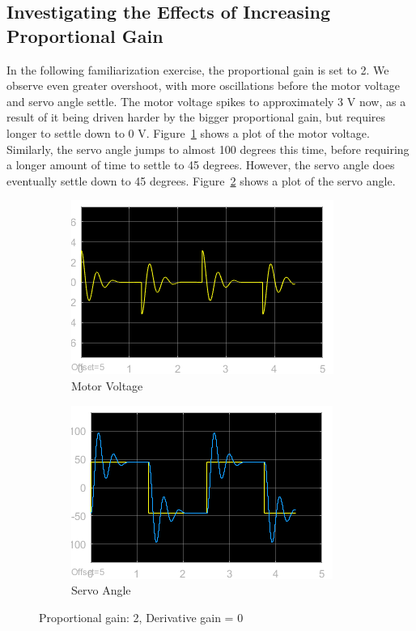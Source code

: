\documentclass[12pt]{article}
\begin{document}
\subsection*{Investigating the Effects of Increasing Proportional Gain} %
In the following familiarization exercise, the proportional gain is set to 2. We observe even greater overshoot, with more oscillations before the motor voltage and servo angle settle. The motor voltage spikes to approximately 3 V now, as a result of it being driven harder by the bigger proportional gain, but requires longer to settle down to 0 V. Figure~\ref{fig:ix_volt} shows a plot of the motor voltage. Similarly, the servo angle jumps to almost 100 degrees this time, before requiring a longer amount of time to settle to 45 degrees. However, the servo angle does eventually settle down to 45 degrees. Figure~\ref{fig:ix_angle} shows a plot of the servo angle.
\begin{figure}[h!]
    \centering
    \begin{subfigure}[b]{0.49\textwidth}
        \includegraphics[width=\textwidth]{ix_voltage}
        \caption{\label{fig:ix_volt}Motor Voltage}
    \end{subfigure}
    \begin{subfigure}[b]{0.49\textwidth}
        \includegraphics[width=\textwidth]{ix_angle}
        \caption{\label{fig:ix_angle}Servo Angle}
    \end{subfigure}
    \caption{\label{fig:ix} Proportional gain: 2, Derivative gain = 0}
\end{figure}
\end{document}
